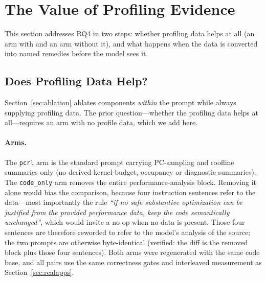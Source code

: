\section{The Value of Profiling Evidence}
\label{sec:evidence}
This section addresses RQ4 in two steps: whether profiling data helps at all (an arm with and an
arm without it), and what happens when the data is converted into named remedies before the model
sees it.

\subsection{Does Profiling Data Help?}
\label{sec:profabl}
Section~\ref{sec:ablation} ablates components \emph{within} the prompt while always supplying profiling
data. The prior question---whether the profiling data helps at all---requires an arm with no profile
data, which we add here.

\paragraph{Arms.}
The \texttt{pcrl} arm is the standard prompt carrying PC-sampling and roofline summaries only (no
derived kernel-budget, occupancy or diagnostic summaries). The \texttt{code\_only} arm removes the
entire performance-analysis block. Removing it alone would bias the comparison, because four
instruction sentences refer to the data---most importantly the rule \textit{``if no safe substantive
optimization can be justified from the provided performance data, keep the code semantically
unchanged''}, which would invite a no-op when no data is present. Those four sentences are therefore
reworded to refer to the model's analysis of the source; the two prompts are otherwise byte-identical
(verified: the diff is the removed block plus those four sentences). Both arms were regenerated with
the same code base, and all pairs use the same correctness gates and interleaved measurement as
Section~\ref{sec:realapps}.

